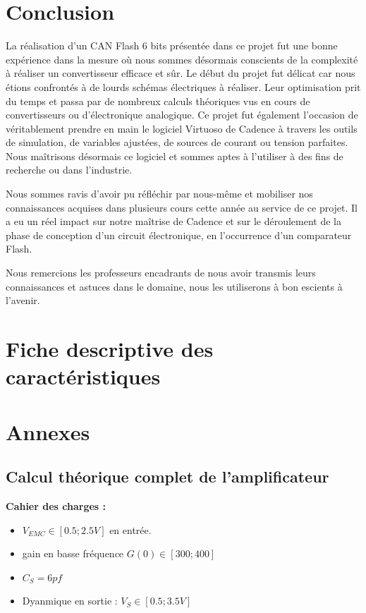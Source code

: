 \documentclass[11pt]{article}
\begin{document}
\section{Conclusion}

La r\'ealisation d'un CAN Flash 6 bits pr\'esent\'ee dans ce projet fut une bonne exp\'erience dans la mesure o\`u nous sommes d\'esormais conscients
de la complexit\'e \`a r\'ealiser un convertisseur efficace et s\^ur.
Le d\'ebut du projet fut d\'elicat car nous \'etions confront\'es \`a de lourds sch\'emas \'electriques \`a r\'ealiser. Leur optimisation prit du temps et
passa par de nombreux calculs th\'eoriques vus en cours de convertisseurs ou d'\'electronique analogique.
Ce projet fut \'egalement l'occasion de v\'eritablement prendre en main le logiciel Virtuoso de Cadence \`a travers les outils de simulation,
 de variables ajust\'ees, de sources de courant ou tension parfaites. Nous maîtrisons d\'esormais ce logiciel et sommes aptes \`a l'utiliser \`a
 des fins de recherche ou dans l'industrie.

Nous sommes ravis d'avoir pu r\'efl\'echir par nous-m\^eme et mobiliser nos connaissances acquises dans plusieurs cours cette ann\'ee au service
de ce projet. Il a eu un r\'eel impact sur notre maîtrise de Cadence et sur le d\'eroulement de la phase de conception d'un circuit \'electronique,
en l'occurrence d'un comparateur Flash.

Nous remercions les professeurs encadrants de nous avoir transmis leurs connaissances et astuces dans le domaine, nous les utiliserons
\`a bon escients \`a l'avenir.

\clearpage

\section{Fiche descriptive des caract\'eristiques}

\clearpage

\section{Annexes}
\subsection{Calcul th\'eorique complet de l'amplificateur}\label{Annexe1}

\textbf{Cahier des charges :} 
\begin{itemize}\itemsep -4pt
\item $V_{EMC} \in [0.5; 2.5V]$ en entr\'ee.
\item gain en basse fr\'equence $G(0) \in [300;400]$
\item $C_{S} = 6 pf$
\item Dyanmique en sortie : $V_{S} \in [0.5; 3.5V]$ 
\end{itemize}
\end{document}
